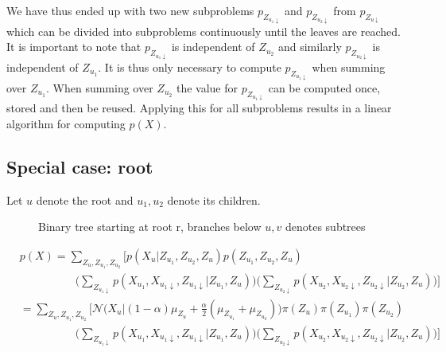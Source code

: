 \documentclass[11pt,oneside,a4paper]{article}
\theoremstyle{definition}
\theoremstyle{remark}
\begin{document}
We have thus ended up with two new subproblems $p_{Z_{u_1\downarrow}}$ and $p_{Z_{u_2\downarrow}}$ from $p_{Z_{u \downarrow}}$ which can be divided into subproblems continuously until the leaves are reached.
\\

It is important to note that $p_{Z_{u_1\downarrow}}$ is independent of $Z_{u_2}$ and similarly $p_{Z_{u_2\downarrow}}$ is independent of $Z_{u_1}$. It is thus only necessary to compute $p_{Z_{u_1\downarrow}}$ when summing over $Z_{u_1}$. When summing over $Z_{u_2}$ the value for $p_{Z_{u_1\downarrow}}$ can be computed once, stored and then be reused. Applying this for all subproblems results in a linear algorithm for computing $p(X)$.

\subsection*{Special case: root}

Let $u$ denote the root and $u_1, u_2$ denote its children.
\begin{figure}[H]
\begin{center}
\end{center}
\caption{Binary tree starting at root r, branches below $u, v$ denotes subtrees}
\end{figure}

\begin{align}
  & p(X) = \sum_{Z_u, Z_{u_1}, Z_{u_2}}\bigg[p(X_u|Z_{u_1}, Z_{u_2}, Z_u) p(Z_{u_1}, Z_{u_2}, Z_u) \nonumber\\
  & \qquad\qquad\quad \Big(\sum_{Z_{u_1 \downarrow}} p(X_{u_1}, X_{u_1 \downarrow}, Z_{u_1 \downarrow}|Z_{u_1}, Z_u) \Big)\Big(\sum_{Z_{u_2 \downarrow}} p(X_{u_2}, X_{u_2 \downarrow}, Z_{u_2 \downarrow}|Z_{u_2}, Z_u) \Big)\bigg] \nonumber \\
  & = \sum_{Z_u, Z_{u_1}, Z_{u_2}}\bigg[\mathcal{N}\Big(X_u|(1-\alpha)\mu_{Z_u} +\frac{\alpha}{2}(\mu_{Z_{u_1}}+\mu_{Z_{u_2}}) \Big) \pi(Z_u) \pi(Z_{u_1}) \pi(Z_{u_2})\\
  & \qquad\qquad\quad \Big(\sum_{Z_{u_1 \downarrow}} p(X_{u_1}, X_{u_1 \downarrow}, Z_{u_1 \downarrow}|Z_{u_1}, Z_u) \Big)\Big(\sum_{Z_{u_2 \downarrow}} p(X_{u_2}, X_{u_2 \downarrow}, Z_{u_2 \downarrow}|Z_{u_2}, Z_u) \Big)\bigg]
\end{align}
\end{document}
